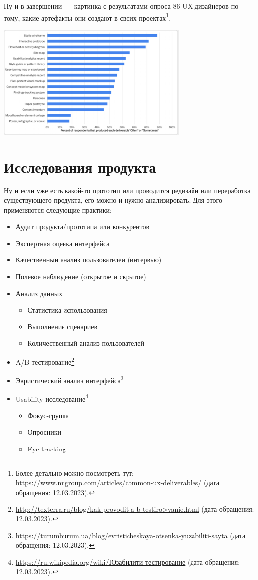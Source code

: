 \documentclass{../../text-style}
\begin{document}
Ну и в завершении~--- картинка с результатами опроса 86 UX-дизайнеров по тому, какие артефакты они создают в своих проектах\footnote{Более детально можно посмотреть тут: \url{https://www.nngroup.com/articles/common-ux-deliverables/} (дата обращения: 12.03.2023).}.

\begin{center}
    \includegraphics[width=0.7\textwidth]{statistics.png}
\end{center}

\section{Исследования продукта}

Ну и если уже есть какой-то прототип или проводится редизайн или переработка существующего продукта, его можно и нужно анализировать. Для этого применяются следующие практики:

\begin{itemize}
    \item Аудит продукта/прототипа или конкурентов
    \item Экспертная оценка интерфейса
    \item Качественный анализ пользователей (интервью)
    \item Полевое наблюдение (открытое и скрытое)
    \item Анализ данных
    \begin{itemize}
        \item Статистика использования
        \item Выполнение сценариев
        \item Количественный анализ пользователей
    \end{itemize}
    \item A/B-тестирование\footnote{\url{http://texterra.ru/blog/kak-provodit-a-b-testiro>vanie.html} (дата обращения: 12.03.2023).}
    \item Эвристический анализ интерфейса\footnote{\url{https://turumburum.ua/blog/evristicheskaya-otsenka-yuzabiliti-sayta} (дата обращения: 12.03.2023).}
    \item Usability-исследование\footnote{\url{https://ru.wikipedia.org/wiki/Юзабилити-тестирование} (дата обращения: 12.03.2023).}
    \begin{itemize}
        \item Фокус-группа
        \item Опросники
        \item Eye tracking
    \end{itemize}
\end{itemize}
\end{document}

